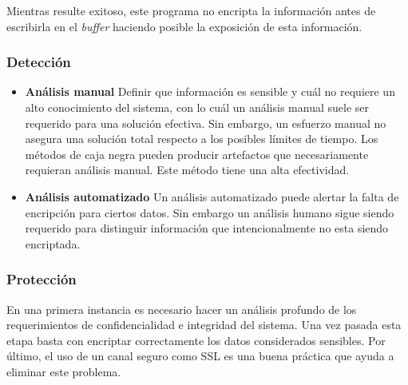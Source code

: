 Mientras resulte exitoso, este programa no encripta la información antes de escribirla en el \textit{buffer} haciendo posible la exposición de esta información.

\subsubsection{Detección}
\begin{itemize}
 \item \textbf{Análisis manual}
	Definir que información es sensible y cuál no requiere un alto conocimiento del sistema, con lo cuál un análisis manual suele ser requerido para una solución efectiva. 
	Sin embargo, un esfuerzo manual no asegura una solución total respecto a los posibles límites de tiempo. 
	Los métodos de caja negra pueden producir artefactos que necesariamente requieran análisis manual.
	Este método tiene una alta efectividad.
  \item \textbf{Análisis automatizado}
  Un análisis automatizado puede alertar la falta de encripción para ciertos datos.
  Sin embargo un análisis humano sigue siendo requerido para distinguir información que intencionalmente no esta siendo encriptada.
\end{itemize}

\subsubsection{Protección}

En una primera instancia es necesario hacer un análisis profundo de los requerimientos de confidencialidad e integridad del sistema. 
Una vez pasada esta etapa basta con encriptar correctamente los datos considerados sensibles.
Por último, el uso de un canal seguro como SSL es una buena práctica que ayuda a eliminar este problema.
